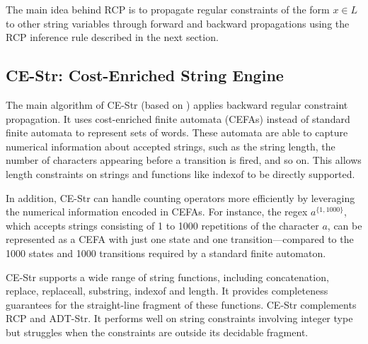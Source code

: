 The main idea behind RCP is to propagate regular constraints of the form
$x \in L$ to other string variables through forward and backward propagations using the RCP inference rule described in the next section.

\subsection{CE-Str: Cost-Enriched String Engine}

The main algorithm of CE-Str (based on \cite{atva2020}) applies backward regular constraint propagation.
It uses cost-enriched finite automata (CEFAs) instead of standard finite automata to represent sets of words.
These automata are able to capture numerical information about accepted strings, such as the string length, the number of characters appearing before a transition is fired, and so on.
This allows length constraints on strings and functions like indexof to be directly supported.

In addition, CE-Str can handle counting operators more efficiently by leveraging the numerical information encoded in CEFAs. For instance, the regex $a^{\{1,1000\}}$, which accepts strings consisting of 1 to 1000 repetitions of the character $a$, can be represented as a CEFA with just one state and one transition—compared to the 1000 states and 1000 transitions required by a standard finite automaton.

CE-Str supports a wide range of string functions, including concatenation, replace, replaceall, substring, indexof and length. It provides completeness guarantees for the straight-line fragment of these functions. CE-Str complements RCP and ADT-Str. It performs well on string constraints involving integer type but struggles when the constraints are outside its decidable fragment.

